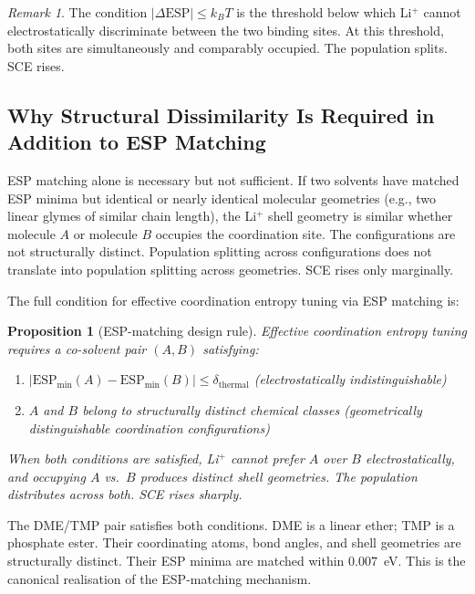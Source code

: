 \documentclass[11pt]{article}
\theoremstyle{plain}
\newtheorem{proposition}[theorem]{Proposition}
\theoremstyle{definition}
\theoremstyle{remark}
\newtheorem{remark}{Remark}[section]
\begin{document}
\begin{remark}
The condition $|\Delta\mathrm{ESP}| \leq k_B T$ is the threshold below
which Li$^+$ cannot electrostatically discriminate between the two binding
sites.  At this threshold, both sites are simultaneously and comparably
occupied.  The population splits.  SCE rises.
\end{remark}

\subsection{Why Structural Dissimilarity Is Required in Addition to ESP Matching}

ESP matching alone is necessary but not sufficient.  If two solvents have
matched ESP minima but identical or nearly identical molecular geometries
(e.g., two linear glymes of similar chain length), the Li$^+$ shell
geometry is similar whether molecule $A$ or molecule $B$ occupies the
coordination site.  The configurations are not structurally distinct.
Population splitting across configurations does not translate into
population splitting across geometries.  SCE rises only marginally.

The full condition for effective coordination entropy tuning via ESP matching
is:

\begin{proposition}[ESP-matching design rule]
Effective coordination entropy tuning requires a co-solvent pair $(A, B)$
satisfying:
\begin{enumerate}[label=(\roman*)]
  \item $|\mathrm{ESP}_{\min}(A) - \mathrm{ESP}_{\min}(B)| \leq
        \delta_{\mathrm{thermal}}$ \quad (electrostatically indistinguishable)
  \item $A$ and $B$ belong to structurally distinct chemical classes \quad
        (geometrically distinguishable coordination configurations)
\end{enumerate}
When both conditions are satisfied, Li$^+$ cannot prefer $A$ over $B$
electrostatically, and occupying $A$ vs.\ $B$ produces distinct shell
geometries.  The population distributes across both.  SCE rises sharply.
\end{proposition}

The DME/TMP pair satisfies both conditions.  DME is a linear ether; TMP is
a phosphate ester.  Their coordinating atoms, bond angles, and shell
geometries are structurally distinct.  Their ESP minima are matched within
$0.007$~eV.  This is the canonical realisation of the ESP-matching
mechanism.
\end{document}

